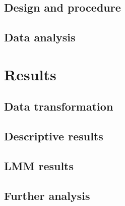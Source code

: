 \documentclass[
  man,floatsintext]{apa7}
\begin{document}
\hypertarget{design-and-procedure}{%
\subsection{Design and procedure}\label{design-and-procedure}}

\hypertarget{data-analysis}{%
\subsection{Data analysis}\label{data-analysis}}

\hypertarget{results}{%
\section{Results}\label{results}}

\hypertarget{data-transformation}{%
\subsection{Data transformation}\label{data-transformation}}

\hypertarget{descriptive-results}{%
\subsection{Descriptive results}\label{descriptive-results}}

\hypertarget{lmm-results}{%
\subsection{LMM results}\label{lmm-results}}

\hypertarget{further-analysis}{%
\subsection{Further analysis}\label{further-analysis}}

\newpage
\end{document}

